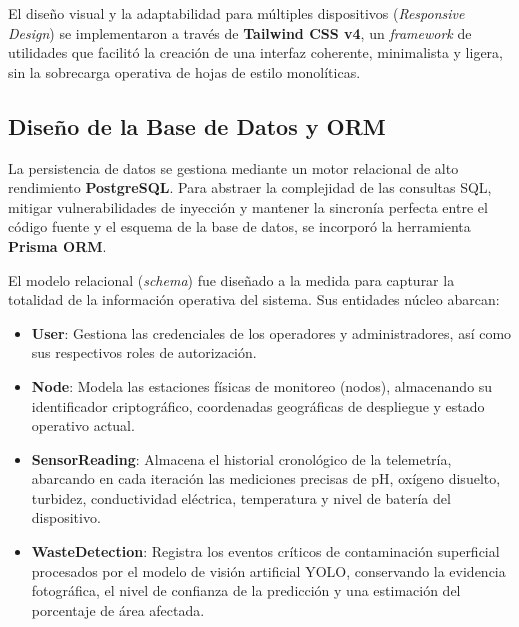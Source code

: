 El diseño visual y la adaptabilidad para múltiples dispositivos (\textit{Responsive Design}) se implementaron a través de \textbf{Tailwind CSS v4}, un \textit{framework} de utilidades que facilitó la creación de una interfaz coherente, minimalista y ligera, sin la sobrecarga operativa de hojas de estilo monolíticas.

\subsection{Diseño de la Base de Datos y ORM}
\label{subsec:diseno_de_la_base_de_datos_y_orm}

La persistencia de datos se gestiona mediante un motor relacional de alto rendimiento \textbf{PostgreSQL}. Para abstraer la complejidad de las consultas SQL, mitigar vulnerabilidades de inyección y mantener la sincronía perfecta entre el código fuente y el esquema de la base de datos, se incorporó la herramienta \textbf{Prisma ORM}.

El modelo relacional (\textit{schema}) fue diseñado a la medida para capturar la totalidad de la información operativa del sistema. Sus entidades núcleo abarcan:
\begin{itemize}
    \item \textbf{User}: Gestiona las credenciales de los operadores y administradores, así como sus respectivos roles de autorización.
    \item \textbf{Node}: Modela las estaciones físicas de monitoreo (nodos), almacenando su identificador criptográfico, coordenadas geográficas de despliegue y estado operativo actual.
    \item \textbf{SensorReading}: Almacena el historial cronológico de la telemetría, abarcando en cada iteración las mediciones precisas de pH, oxígeno disuelto, turbidez, conductividad eléctrica, temperatura y nivel de batería del dispositivo.
    \item \textbf{WasteDetection}: Registra los eventos críticos de contaminación superficial procesados por el modelo de visión artificial YOLO, conservando la evidencia fotográfica, el nivel de confianza de la predicción y una estimación del porcentaje de área afectada.
\end{itemize}

